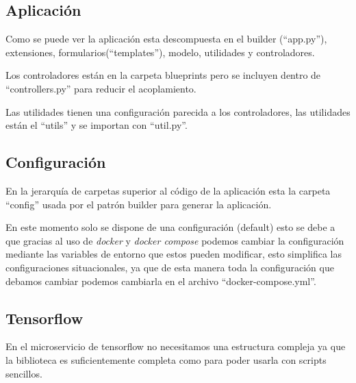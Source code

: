 \subsection{Aplicación}
Como se puede ver la aplicación esta descompuesta en el builder (``app.py''), extensiones, formularios(``templates''), modelo, utilidades y controladores.

Los controladores están en la carpeta blueprints pero se incluyen dentro de ``controllers.py'' para reducir el acoplamiento.

Las utilidades tienen una configuración parecida a los controladores, las utilidades están el ``utils'' y se importan con ``util.py''.


\subsection{Configuración}
En la jerarquía de carpetas superior al código de la aplicación esta la carpeta ``config'' usada por el patrón builder para generar la aplicación.

En este momento solo se dispone de una configuración (default) esto se debe a que gracias al uso de \emph{docker} y \emph{docker compose} podemos cambiar la configuración mediante las variables de entorno que estos pueden modificar, esto simplifica las configuraciones situacionales, ya que de esta manera toda la configuración que debamos cambiar podemos cambiarla en el archivo ``docker-compose.yml''.

\subsection{Tensorflow}
En el microservicio de tensorflow no necesitamos una estructura compleja ya que la biblioteca es suficientemente completa como para poder usarla con scripts sencillos.







